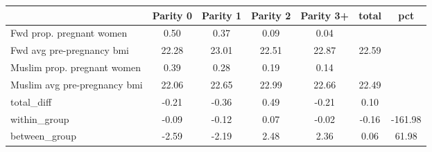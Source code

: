 \begin{tabular}{l*{6}{c}}
\toprule
            &\multicolumn{1}{c}{Parity 0}&\multicolumn{1}{c}{Parity 1}&\multicolumn{1}{c}{Parity 2}&\multicolumn{1}{c}{Parity 3+}&\multicolumn{1}{c}{total}&\multicolumn{1}{c}{pct}\\
\midrule
\midrule
Fwd prop. pregnant women&        0.50&        0.37&        0.09&        0.04&            &            \\
Fwd avg pre-pregnancy bmi&       22.28&       23.01&       22.51&       22.87&       22.59&            \\
Muslim prop. pregnant women&        0.39&        0.28&        0.19&        0.14&            &            \\
Muslim avg pre-pregnancy bmi&       22.06&       22.65&       22.99&       22.66&       22.49&            \\
total\_diff  &       -0.21&       -0.36&        0.49&       -0.21&        0.10&            \\
within\_group&       -0.09&       -0.12&        0.07&       -0.02&       -0.16&     -161.98\\
between\_group&       -2.59&       -2.19&        2.48&        2.36&        0.06&       61.98\\
\bottomrule
\end{tabular}
